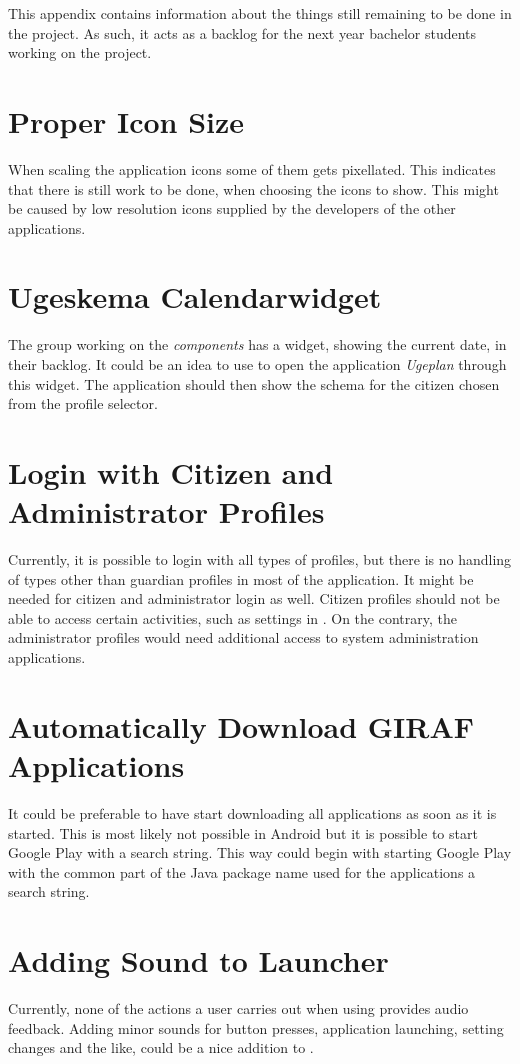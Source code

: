 This appendix contains information about the things still remaining to be done in the \launcher project.
As such, it acts as a backlog for the next year bachelor students working on the project.

\section{Proper Icon Size}
When scaling the application icons some of them gets pixellated.
This indicates that there is still work to be done, when choosing the icons to show.
This might be caused by low resolution icons supplied by the developers of the other applications.

\section{Ugeskema Calendarwidget}
The group working on the \textit{\giraf components} has a widget, showing the current date, in their backlog.
It could be an idea to use to open the application \textit{Ugeplan} through this widget. The application should then show the schema for the citizen chosen from the profile selector.

\section{Login with Citizen and Administrator Profiles}
Currently, it is possible to login with all types of profiles, but there is no handling of types other than guardian profiles in most of the application.
It might be needed for citizen and administrator login as well.
Citizen profiles should not be able to access certain activities, such as settings in \launcher.
On the contrary, the administrator profiles would need additional access to system administration applications.

\section{Automatically Download GIRAF Applications}
It could be preferable to have \launcher start downloading all \giraf applications as soon as it is started.
This is most likely not possible in Android but it is possible to start Google Play with a search string.
This way  \launcher could begin with starting Google Play with the common part of the Java package name used for the \giraf applications a search string.

\section{Adding Sound to Launcher}
Currently, none of the actions a user carries out when using \launcher provides audio feedback.
Adding minor sounds for button presses, application launching, setting changes and the like, could be a nice addition to \launcher. 

